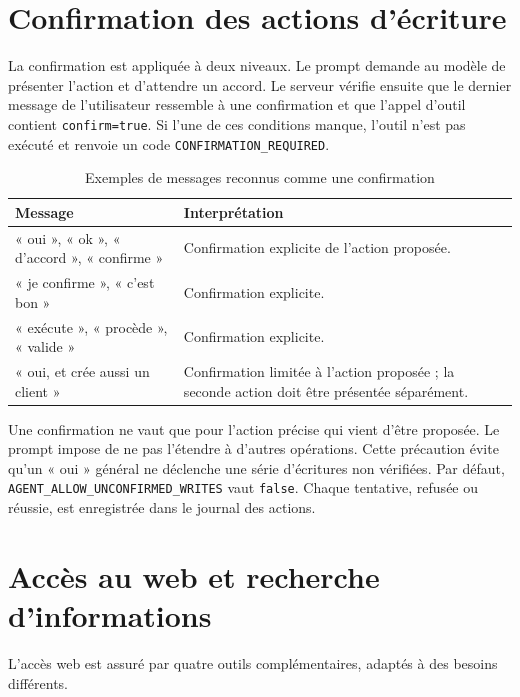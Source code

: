 \documentclass[12pt,a4paper,oneside]{report}
\newcommand{\code}[1]{\texttt{#1}}
\begin{document}
\section{Confirmation des actions d'écriture}
La confirmation est appliquée à deux niveaux. Le prompt demande au modèle de présenter l'action et d'attendre un accord. Le serveur vérifie ensuite que le dernier message de l'utilisateur ressemble à une confirmation et que l'appel d'outil contient \code{confirm=true}. Si l'une de ces conditions manque, l'outil n'est pas exécuté et renvoie un code \code{CONFIRMATION\_REQUIRED}.

\begin{table}[H]\centering
\caption{Exemples de messages reconnus comme une confirmation}
\begin{tabularx}{\textwidth}{p{5cm}Y}
\toprule \textbf{Message} & \textbf{Interprétation}\\ \midrule
« oui », « ok », « d'accord », « confirme » & Confirmation explicite de l'action proposée.\\
« je confirme », « c'est bon » & Confirmation explicite.\\
« exécute », « procède », « valide » & Confirmation explicite.\\
« oui, et crée aussi un client » & Confirmation limitée à l'action proposée ; la seconde action doit être présentée séparément.\\
\bottomrule
\end{tabularx}
\end{table}

Une confirmation ne vaut que pour l'action précise qui vient d'être proposée. Le prompt impose de ne pas l'étendre à d'autres opérations. Cette précaution évite qu'un « oui » général ne déclenche une série d'écritures non vérifiées. Par défaut, \code{AGENT\_ALLOW\_UNCONFIRMED\_WRITES} vaut \code{false}. Chaque tentative, refusée ou réussie, est enregistrée dans le journal des actions.

\section{Accès au web et recherche d'informations}
L'accès web est assuré par quatre outils complémentaires, adaptés à des besoins différents.
\end{document}
